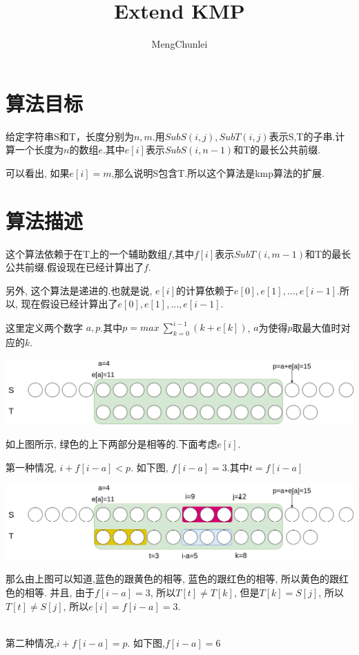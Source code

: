 \documentclass{article}
\title{Extend KMP}
\author{MengChunlei}
\begin{document}
\maketitle
\section{算法目标}
给定字符串S和T，长度分别为$n,m$.用$SubS(i,j), SubT(i,j)$表示S,T的子串.计算一个长度为$n$的数组$e$.其中$e[i]$表示$SubS(i,n-1)$和T的最长公共前缀. \par
可以看出, 如果$e[i]=m$,那么说明S包含T.所以这个算法是kmp算法的扩展.

\section{算法描述}
这个算法依赖于在T上的一个辅助数组$f$,其中$f[i]$表示$SubT(i,m-1)$和T的最长公共前缀.假设现在已经计算出了$f$. \par
另外, 这个算法是递进的.也就是说, $e[i]$的计算依赖于$e[0],e[1],...,e[i-1]$.所以, 现在假设已经计算出了$e[0],e[1],...,e[i-1]$. \par
这里定义两个数字 $a,p$.其中$p=max\ \sum_{k=0}^{i-1}(k+e[k])$, $a$为使得$p$取最大值时对应的$k$. \par
\includegraphics[scale=0.39]{pic1.png} \par
如上图所示, 绿色的上下两部分是相等的.下面考虑$e[i]$. \par
第一种情况, $i+f[i-a]<p$. 如下图, $f[i-a]=3$.其中$t=f[i-a]$ \par
\includegraphics[scale=0.39]{pic2.png} \par
那么由上图可以知道,蓝色的跟黄色的相等, 蓝色的跟红色的相等, 所以黄色的跟红色的相等. 并且, 由于$f[i-a]=3$, 所以$T[t]\neq T[k]$, 但是$T[k]=S[j]$, 所以$T[t] \neq S[j]$, 所以$e[i]=f[i-a]=3$.\par
~\\
第二种情况,$i+f[i-a]=p$. 如下图,$f[i-a]=6$ \par
\end{document}
